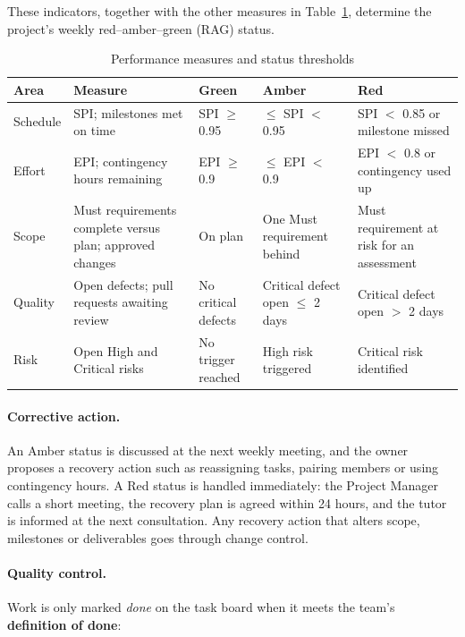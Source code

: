 These indicators, together with the other measures in Table~\ref{tab:kpis}, determine the project's weekly red--amber--green (RAG) status.

\begin{table}[htbp]
\centering
\caption{Performance measures and status thresholds}
\label{tab:kpis}
\begin{tabularx}{\textwidth}{@{}>{\raggedright\arraybackslash}p{} >{\raggedright\arraybackslash}X >{\raggedright\arraybackslash}p{} >{\raggedright\arraybackslash}p{} >{\raggedright\arraybackslash}p{}@{}}
  \toprule
  \textbf{Area} & \textbf{Measure} & \cellcolor{risklow}\textbf{Green} & \cellcolor{riskmed}\textbf{Amber} & \cellcolor{riskcrit}\textbf{Red} \\
  \midrule
  Schedule & SPI; milestones met on time & SPI $\geq$ 0.95 & 0.85 $\leq$ SPI $<$ 0.95 & SPI $<$ 0.85 or milestone missed \\
  Effort & EPI; contingency hours remaining & EPI $\geq$ 0.9 & 0.8 $\leq$ EPI $<$ 0.9 & EPI $<$ 0.8 or contingency used up \\
  Scope & Must requirements complete versus plan; approved changes & On plan & One Must requirement behind & Must requirement at risk for an assessment \\
  Quality & Open defects; pull requests awaiting review & No critical defects & Critical defect open $\leq$ 2 days & Critical defect open $>$ 2 days \\
  Risk & Open High and Critical risks & No trigger reached & High risk triggered & Critical risk identified \\
  \bottomrule
\end{tabularx}
\end{table}

\paragraph{Corrective action.} An Amber status is discussed at the next weekly meeting, and the owner proposes a recovery action such as reassigning tasks, pairing members or using contingency hours. A Red status is handled immediately: the Project Manager calls a short meeting, the recovery plan is agreed within 24 hours, and the tutor is informed at the next consultation. Any recovery action that alters scope, milestones or deliverables goes through change control.

\paragraph{Quality control.} Work is only marked \emph{done} on the task board when it meets the team's \textbf{definition of done}:

